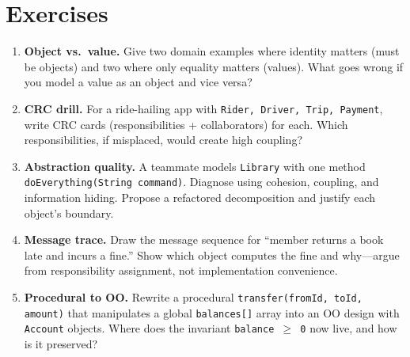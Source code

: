 \section{Exercises}
\label{sec:ch01-exercises}
\begin{enumerate}[label=E1.\arabic*, leftmargin=*, itemsep=0.8em]
    \item \textbf{Object vs.\ value.} Give two domain examples where identity matters (must be objects) and two where only equality matters (values). What goes wrong if you model a value as an object and vice versa?
    \item \textbf{CRC drill.} For a ride-hailing app with \texttt{Rider, Driver, Trip, Payment}, write CRC cards (responsibilities + collaborators) for each. Which responsibilities, if misplaced, would create high coupling?
    \item \textbf{Abstraction quality.} A teammate models \texttt{Library} with one method \texttt{doEverything(String command)}. Diagnose using cohesion, coupling, and information hiding. Propose a refactored decomposition and justify each object's boundary.
    \item \textbf{Message trace.} Draw the message sequence for ``member returns a book late and incurs a fine.'' Show which object computes the fine and why---argue from responsibility assignment, not implementation convenience.
    \item \textbf{Procedural to OO.} Rewrite a procedural \texttt{transfer(fromId, toId, amount)} that manipulates a global \texttt{balances[]} array into an OO design with \texttt{Account} objects. Where does the invariant \texttt{balance $\ge$ 0} now live, and how is it preserved?
\end{enumerate}
